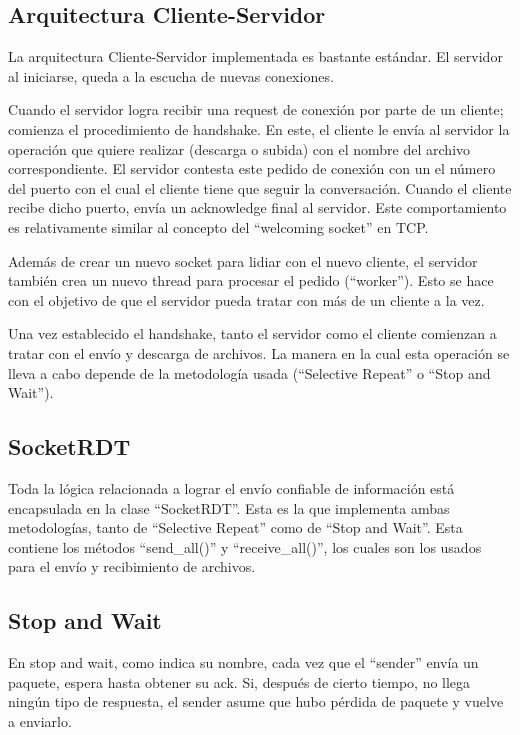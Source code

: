 \documentclass{article}
\begin{document}
\subsection{Arquitectura Cliente-Servidor}\label{arquitectura-cliente-servidor}

La arquitectura Cliente-Servidor implementada es bastante estándar. El servidor al iniciarse, queda a la escucha de nuevas conexiones.

Cuando el servidor logra recibir una request de conexión por parte de un cliente; comienza el procedimiento de handshake. En este, el cliente le envía al servidor la operación que quiere realizar (descarga o subida) con el nombre del archivo correspondiente. El servidor contesta este pedido de conexión con un el número del puerto con el cual el cliente tiene que seguir la conversación. Cuando el cliente recibe dicho puerto, envía un acknowledge final al servidor. Este comportamiento es relativamente similar al concepto del ``welcoming socket'' en TCP.

Además de crear un nuevo socket para lidiar con el nuevo cliente, el servidor también crea un nuevo thread para procesar el pedido (``worker''). Esto se hace con el objetivo de que el servidor pueda tratar con más de un cliente a la vez.

Una vez establecido el handshake, tanto el servidor como el cliente comienzan a tratar con el envío y descarga de archivos. La manera en la cual esta operación se lleva a cabo depende de la metodología usada (``Selective Repeat'' o ``Stop and Wait'').

\subsection{SocketRDT}\label{socketrdt}

Toda la lógica relacionada a lograr el envío confiable de información está encapsulada en la clase ``SocketRDT''. Esta es la que implementa ambas metodologías, tanto de ``Selective Repeat'' como de ``Stop and Wait''. Esta contiene los métodos ``send\_all()'' y ``receive\_all()'', los cuales son los usados para el envío y recibimiento de archivos.

\subsection{Stop and Wait}\label{stop-and-wait}

En stop and wait, como indica su nombre, cada vez que el ``sender'' envía un paquete, espera hasta obtener su ack. Si, después de cierto tiempo, no llega ningún tipo de respuesta, el sender asume que hubo pérdida de paquete y vuelve a enviarlo.
\end{document}
